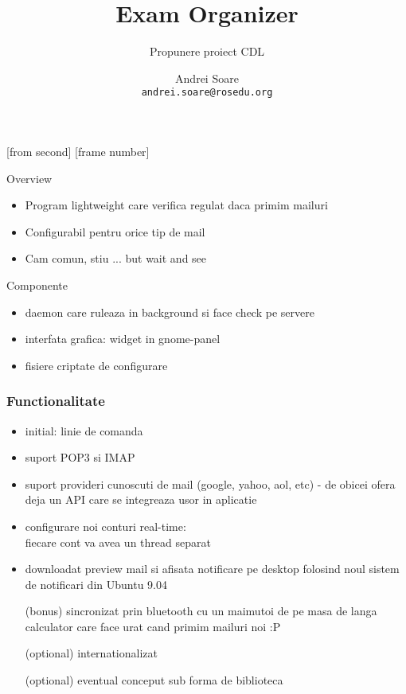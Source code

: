\documentclass{beamer}
\title{Exam Organizer}
\subtitle{Propunere proiect CDL}
\institute{ROSEdu}
\author{Andrei Soare \\ \texttt{andrei.soare@rosedu.org}}
\begin{document}
[from second]
[frame number]

\frame{\titlepage}

\begin{frame}{Overview}
\begin{itemize}
\item Program lightweight care verifica regulat daca primim mailuri
\item Configurabil pentru orice tip de mail\vspace{1cm}\pause
\item Cam comun, stiu ... but wait and see
\end{itemize}
\end{frame}

\begin{frame}{Componente}
\begin{itemize}
\item daemon care ruleaza in background si face check pe servere
\item interfata grafica: widget in gnome-panel
\item fisiere criptate de configurare
\end{itemize}
\end{frame}

\begin{frame}[allowframebreaks]
\frametitle{Functionalitate}
\begin{itemize}
\item initial: linie de comanda
\item suport POP3 si IMAP
\item suport provideri cunoscuti de mail (google, yahoo, aol, etc) - de obicei
ofera deja un API care se integreaza usor in aplicatie
\item configurare noi conturi real-time:\\fiecare cont va avea un thread separat
\item downloadat preview mail si afisata notificare pe desktop folosind noul sistem
de notificari din Ubuntu 9.04\framebreak
\item [(bonus)] sincronizat prin bluetooth cu un maimutoi de pe masa de langa calculator
care face urat cand primim mailuri noi :P
\item [(optional)]internationalizat
\item [(optional)] eventual conceput sub forma de biblioteca
\end{itemize}
\end{frame}
\end{document}
